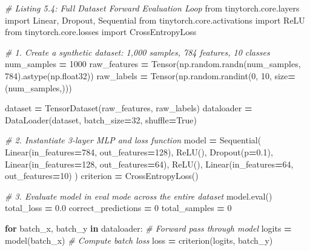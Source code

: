 \documentclass[
  letterpaper,
]{scrbook}
\newenvironment{Shaded}{\begin{snugshade}}{\end{snugshade}}
\newcommand{\BuiltInTok}[1]{#1}
\newcommand{\CommentTok}[1]{\textcolor[rgb]{0.56,0.35,0.01}{\textit{#1}}}
\newcommand{\ControlFlowTok}[1]{\textcolor[rgb]{0.13,0.29,0.53}{\textbf{#1}}}
\newcommand{\DecValTok}[1]{\textcolor[rgb]{0.00,0.00,0.81}{#1}}
\newcommand{\FloatTok}[1]{\textcolor[rgb]{0.00,0.00,0.81}{#1}}
\newcommand{\ImportTok}[1]{#1}
\newcommand{\KeywordTok}[1]{\textcolor[rgb]{0.13,0.29,0.53}{\textbf{#1}}}
\newcommand{\NormalTok}[1]{#1}
\newcommand{\OperatorTok}[1]{\textcolor[rgb]{0.81,0.36,0.00}{\textbf{#1}}}
\newcommand{\VariableTok}[1]{\textcolor[rgb]{0.00,0.00,0.00}{#1}}
\begin{document}
\begin{Shaded}
\begin{Highlighting}[]
\CommentTok{\# Listing 5.4: Full Dataset Forward Evaluation Loop}
\ImportTok{from}\NormalTok{ tinytorch.core.layers }\ImportTok{import}\NormalTok{ Linear, Dropout, Sequential}
\ImportTok{from}\NormalTok{ tinytorch.core.activations }\ImportTok{import}\NormalTok{ ReLU}
\ImportTok{from}\NormalTok{ tinytorch.core.losses }\ImportTok{import}\NormalTok{ CrossEntropyLoss}

\CommentTok{\# 1. Create a synthetic dataset: 1,000 samples, 784 features, 10 classes}
\NormalTok{num\_samples }\OperatorTok{=} \DecValTok{1000}
\NormalTok{raw\_features }\OperatorTok{=}\NormalTok{ Tensor(np.random.randn(num\_samples, }\DecValTok{784}\NormalTok{).astype(np.float32))}
\NormalTok{raw\_labels }\OperatorTok{=}\NormalTok{ Tensor(np.random.randint(}\DecValTok{0}\NormalTok{, }\DecValTok{10}\NormalTok{, size}\OperatorTok{=}\NormalTok{(num\_samples,)))}

\NormalTok{dataset }\OperatorTok{=}\NormalTok{ TensorDataset(raw\_features, raw\_labels)}
\NormalTok{dataloader }\OperatorTok{=}\NormalTok{ DataLoader(dataset, batch\_size}\OperatorTok{=}\DecValTok{32}\NormalTok{, shuffle}\OperatorTok{=}\VariableTok{True}\NormalTok{)}

\CommentTok{\# 2. Instantiate 3{-}layer MLP and loss function}
\NormalTok{model }\OperatorTok{=}\NormalTok{ Sequential(}
\NormalTok{    Linear(in\_features}\OperatorTok{=}\DecValTok{784}\NormalTok{, out\_features}\OperatorTok{=}\DecValTok{128}\NormalTok{),}
\NormalTok{    ReLU(),}
\NormalTok{    Dropout(p}\OperatorTok{=}\FloatTok{0.1}\NormalTok{),}
\NormalTok{    Linear(in\_features}\OperatorTok{=}\DecValTok{128}\NormalTok{, out\_features}\OperatorTok{=}\DecValTok{64}\NormalTok{),}
\NormalTok{    ReLU(),}
\NormalTok{    Linear(in\_features}\OperatorTok{=}\DecValTok{64}\NormalTok{, out\_features}\OperatorTok{=}\DecValTok{10}\NormalTok{)}
\NormalTok{)}
\NormalTok{criterion }\OperatorTok{=}\NormalTok{ CrossEntropyLoss()}

\CommentTok{\# 3. Evaluate model in eval mode across the entire dataset}
\NormalTok{model.}\BuiltInTok{eval}\NormalTok{()}
\NormalTok{total\_loss }\OperatorTok{=} \FloatTok{0.0}
\NormalTok{correct\_predictions }\OperatorTok{=} \DecValTok{0}
\NormalTok{total\_samples }\OperatorTok{=} \DecValTok{0}

\ControlFlowTok{for}\NormalTok{ batch\_x, batch\_y }\KeywordTok{in}\NormalTok{ dataloader:}
    \CommentTok{\# Forward pass through model}
\NormalTok{    logits }\OperatorTok{=}\NormalTok{ model(batch\_x)}
    \CommentTok{\# Compute batch loss}
\NormalTok{    loss }\OperatorTok{=}\NormalTok{ criterion(logits, batch\_y)}


\end{Highlighting}
\end{Shaded}
\end{document}
